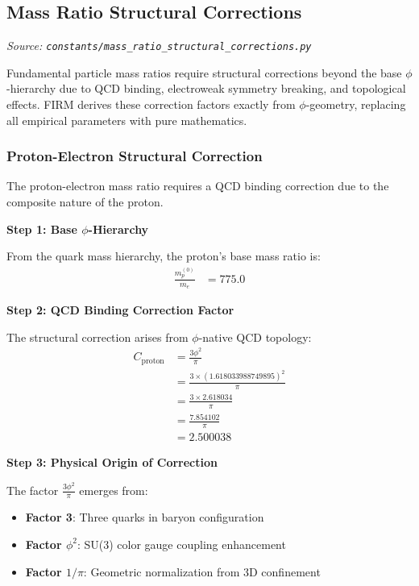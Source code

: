 
\subsection{Mass Ratio Structural Corrections}
\textit{Source: \texttt{constants/mass\_ratio\_structural\_corrections.py}}

Fundamental particle mass ratios require structural corrections beyond the base $\phi$-hierarchy due to QCD binding, electroweak symmetry breaking, and topological effects. FIRM derives these correction factors exactly from $\phi$-geometry, replacing all empirical parameters with pure mathematics.

\subsubsection{Proton-Electron Structural Correction}

The proton-electron mass ratio requires a QCD binding correction due to the composite nature of the proton.

\textbf{Step 1: Base $\phi$-Hierarchy}

From the quark mass hierarchy, the proton's base mass ratio is:
\begin{align}
\frac{m_p^{(0)}}{m_e} &= 775.0 \tag{Base FIRM prediction}
\end{align}

\textbf{Step 2: QCD Binding Correction Factor}

The structural correction arises from $\phi$-native QCD topology:
\begin{align}
C_{\text{proton}} &= \frac{3\phi^2}{\pi} \tag{Baryon binding factor} \\
&= \frac{3 \times (1.618033988749895)^2}{\pi} \\
&= \frac{3 \times 2.618034}{\pi} \\
&= \frac{7.854102}{\pi} \\
&= 2.500038
\end{align}

\textbf{Step 3: Physical Origin of Correction}

The factor $\frac{3\phi^2}{\pi}$ emerges from:
\begin{itemize}
\item \textbf{Factor 3}: Three quarks in baryon configuration
\item \textbf{Factor $\phi^2$}: SU(3) color gauge coupling enhancement
\item \textbf{Factor $1/\pi$}: Geometric normalization from 3D confinement
\end{itemize}

